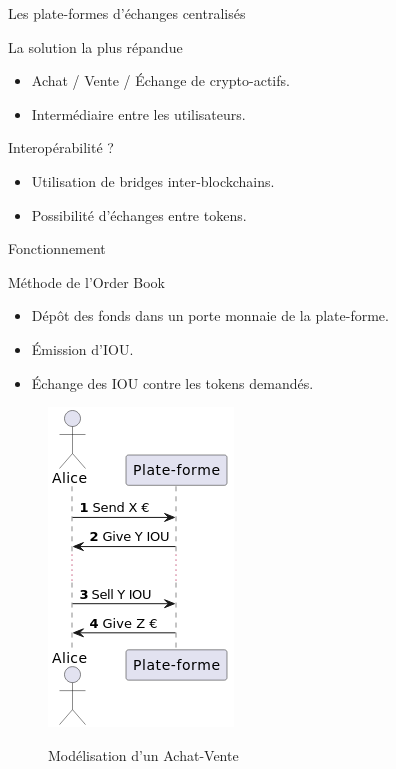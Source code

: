 \begin{frame}{Les plate-formes d'échanges centralisés}
    \begin{block}{La solution la plus répandue}
        \begin{itemize}
            \item Achat / Vente / Échange de crypto-actifs.
            \item Intermédiaire entre les utilisateurs.
        \end{itemize}
    \end{block}
    \pause
    \begin{block}{Interopérabilité ?}
        \begin{itemize}
            \item Utilisation de bridges inter-blockchains.
            \item Possibilité d'échanges entre tokens.
        \end{itemize}
    \end{block}
\end{frame}

\begin{frame}{Fonctionnement}    
    \begin{block}{Méthode de l'Order Book}
        \begin{itemize}
            \item Dépôt des fonds dans un porte monnaie de la plate-forme. 
            \item Émission d'IOU\footnotemark.
            \item Échange des IOU contre les tokens demandés.
        \end{itemize}
    \end{block}
    \begin{figure}
        \centering
        \includegraphics[scale = 0.45]{centralisation/img_plateformes/achat-vente.png}
        \label{fig:Order}
        \caption{Modélisation d'un Achat-Vente}
    \end{figure}
\end{frame}

